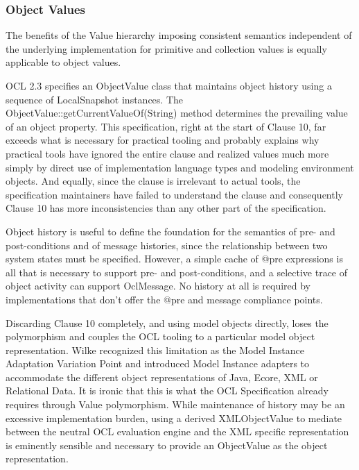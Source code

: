 \documentclass{eceasst}
\begin{document}
\subsubsection{Object Values}

The benefits of the Value hierarchy imposing consistent semantics independent of the underlying implementation for primitive and collection values is equally applicable to object values.

OCL 2.3 specifies an ObjectValue class that maintains object history using a sequence of LocalSnapshot instances. The  ObjectValue::getCurrentValueOf(String) method determines the prevailing value of an object property. This specification, right at the start of Clause 10, far exceeds what is necessary for practical tooling and probably explains why practical tools have ignored the entire clause and realized values  much more simply by direct use of implementation language types and modeling environment objects. And equally, since the clause is irrelevant to actual tools, the specification maintainers have failed to understand the clause and consequently Clause 10 has more inconsistencies than any other part of the specification.

Object history is useful to define the foundation for the semantics of pre- and post-conditions and of message histories, since the relationship between two system states must be specified. However, a simple cache of @pre expressions is all that is necessary to support pre- and post-conditions, and a selective trace of object activity can support OclMessage. No history at all is required by implementations that don't offer the @pre and message compliance points.

Discarding Clause 10 completely, and using model objects directly, loses the polymorphism and couples the OCL tooling to a particular model object representation. Wilke\cite{Variability} recognized this limitation as the Model Instance Adaptation Variation Point and introduced Model Instance adapters to accommodate the different object representations of Java, Ecore, XML or Relational Data. It is ironic that this is what the OCL Specification already requires through Value polymorphism. While maintenance of history may be an excessive implementation burden, using a derived XMLObjectValue to mediate between the neutral OCL evaluation engine and the XML specific representation is eminently sensible and necessary to provide an ObjectValue as the object representation.
\end{document}
